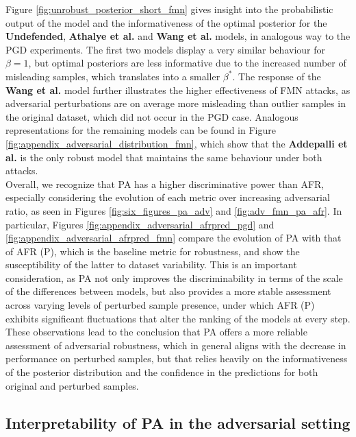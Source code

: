 Figure \ref{fig:unrobust_posterior_short_fmn} gives insight into the probabilistic output
of the model and the informativeness of the optimal posterior for the {\color{tab:orange} \textbf{Undefended}}, 
{\color{tab:green} \textbf{Athalye et al.}} and {\color{tab:brown} \textbf{Wang et al.}} models, in
analogous way to the PGD experiments. The first two models display a very similar behaviour for 
$\beta = 1$, but optimal posteriors are less informative due to the increased number of misleading
samples, which translates into a smaller $\beta^{*}$. The response of 
the {\color{tab:brown} \textbf{Wang et al.}} model further illustrates the higher effectiveness of
FMN attacks, as adversarial perturbations are on average more misleading than outlier samples in
the original dataset, which did not occur in the PGD case. Analogous representations for the remaining
models can be found in Figure \ref{fig:appendix_adversarial_distribution_fmn}, which show
that the {\color{tab:purple} \textbf{Addepalli et al.}} is the only robust model that maintains
the same behaviour under both attacks.\\

Overall, we recognize that PA has a higher discriminative power than AFR, especially
considering the evolution of each metric over increasing adversarial ratio, as
seen in Figures \ref{fig:six_figures_pa_adv} and \ref{fig:adv_fmn_pa_afr}. 
In particular, Figures \ref{fig:appendix_adversarial_afrpred_pgd} and \ref{fig:appendix_adversarial_afrpred_fmn}
compare the evolution of PA with that of AFR (P), which is the baseline metric for robustness,
and show the susceptibility of the latter to dataset variability. This is an important
consideration, as PA not only improves the discriminability in terms of the scale of
the differences between models, but also provides a more stable assessment across varying
levels of perturbed sample presence, under which AFR (P) exhibits significant fluctuations
that alter the ranking of the models at every step. \\

These observations lead to the conclusion that PA offers a more reliable
assessment of adversarial robustness, which in general aligns with the decrease
in performance on perturbed samples, but that relies heavily on the informativeness
of the posterior distribution and the confidence in the predictions for both
original and perturbed samples. \\

\subsection{Interpretability of PA in the adversarial setting}

